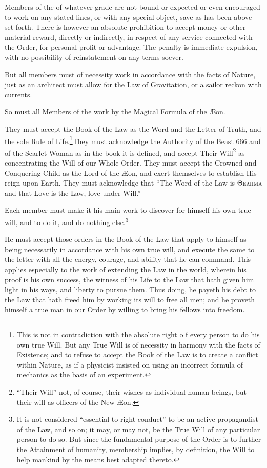 Members of the \Argentium{} of whatever grade are not bound or expected or even encouraged to work on any stated lines, or with any special object, save as has been above set forth. There is however an absolute prohibition to accept money or other material reward, directly or indirectly, in respect of any service connected with the Order, for personal profit or advantage. The penalty is immediate expulsion, with no possibility of reinstatement on any terms soever.

But all members must of necessity work in accordance with the facts of Nature, just as an architect must allow for the Law of Gravitation, or a sailor reckon with currents.

So must all Members of the \Argentium{} work by the Magical Formula of the \AE{}on.

They must accept the Book of the Law as the Word and the Letter of Truth, and the sole Rule of Life.\footnote{This is not in contradiction with the absolute right o f every person to do his own true Will. But any True Will is of necessity in harmony with the facts of Existence; and to refuse to accept the Book of the Law is to create a conflict within Nature, as if a physicist insisted on using an incorrect formula of mechanics as the basis of an experiment.}They must acknowledge the Authority of the Beast 666 and of the Scarlet Woman as in the book it is defined, and accept Their Will\footnote{\enquote{Their Will} \textemdash{} not, of course, their wishes as individual human beings, but their will as officers of the New \AE{}on.} as concentrating the Will of our Whole Order. They must accept the Crowned and Conquering Child as the Lord of the \AE{}on, and exert themselves to establish His reign upon Earth. They must acknowledge that \enquote{The Word of the Law is \textgreek{\textsc{Θελημα}} and that Love is the Law, love under Will.}

Each member must make it his main work to discover for himself his own true will, and to do it, and do nothing else.\footnote{It is not considered \enquote{essential to right conduct} to be an active propagandist of the Law, and so on; it may, or may not, be the True Will of any particular person to do so. But since the fundamental purpose of the Order is to further the Attainment of humanity, membership implies, by definition, the Will to help mankind by the means best adapted thereto.}

He must accept those orders in the Book of the Law that apply to himself as being necessarily in accordance with his own true will, and execute the same to the letter with all the energy, courage, and ability that he can command. This applies especially to the work of extending the Law in the world, wherein his proof is his own success, the witness of his Life to the Law that hath given him light in his ways, and liberty to pursue them. Thus doing, he payeth his debt to the Law that hath freed him by working its will to free all men; and he proveth himself a true man in our Order by willing to bring his fellows into freedom.

